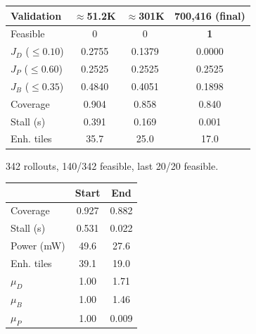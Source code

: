 \documentclass[aspectratio=169]{beamer}
\begin{document}
\begin{frame}
\begin{center}
{\scriptsize
\setlength{\tabcolsep}{4pt}
\begin{tabular}{lccc}
\toprule
Validation & $\approx$51.2K & $\approx$301K & 700{,}416 (final) \\
\midrule
Feasible & 0 & 0 & \textbf{1} \\
$J_D$ ($\le0.10$) & 0.2755 & 0.1379 & 0.0000 \\
$J_P$ ($\le0.60$) & 0.2525 & 0.2525 & 0.2525 \\
$J_B$ ($\le0.35$) & 0.4840 & 0.4051 & 0.1898 \\
Coverage & 0.904 & 0.858 & 0.840 \\
Stall (s) & 0.391 & 0.169 & 0.001 \\
Enh. tiles & 35.7 & 25.0 & 17.0 \\
\bottomrule
\end{tabular}}
\end{center}
\vspace{6pt}
\footnotesize 342 rollouts, 140/342 feasible, last 20/20 feasible.
\end{frame}

\begin{frame}
\begin{center}
{\footnotesize
\begin{tabular}{lcc}
\toprule
 & Start & End \\
\midrule
Coverage & 0.927 & 0.882 \\
Stall (s) & 0.531 & 0.022 \\
Power (mW) & 49.6 & 27.6 \\
Enh. tiles & 39.1 & 19.0 \\
\addlinespace
$\mu_D$ & 1.00 & 1.71 \\
$\mu_B$ & 1.00 & 1.46 \\
$\mu_P$ & 1.00 & 0.009 \\
\bottomrule
\end{tabular}}
\end{center}
\end{frame}
\end{document}

